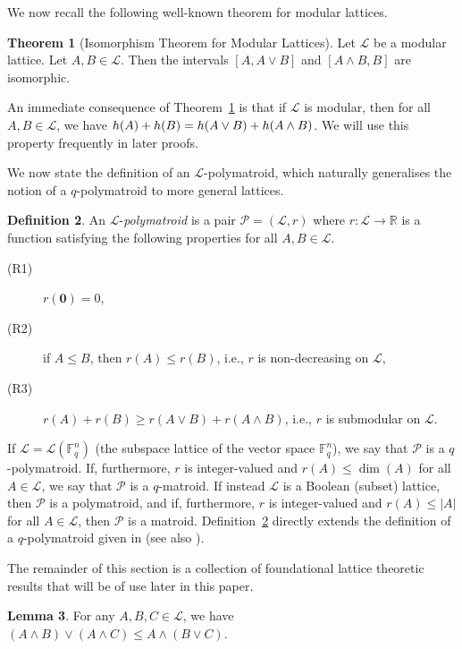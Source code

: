 \documentclass[a4paper,11pt,reqno]{article}
\makeatletter
\def\namedlabel#1#2{\begingroup
    #2%
    \def\@currentlabel{#2}%
    \phantomsection\label{#1}\endgroup
}
\theoremstyle{definition}
\newtheorem{theorem}{Theorem}[section]
\newtheorem{definition}[theorem]{{{Definition}}}
\newtheorem{lemma}[theorem]{{{Lemma}}}
\newcommand{\mL}{\mathcal{L}}
\newcommand{\mP}{\mathcal{P}}
\newcommand{\F}{\mathbb{F}}
\newcommand{\zero}{{\mathbf{0}}}
\makeatother
\begin{document}
We now recall the following well-known theorem for modular lattices.
\begin{theorem}[Isomorphism Theorem for Modular Lattices]\label{thm:isom_thm_lattices}
    Let $\mL$ be a modular lattice. Let $A,B\in\mathcal{L}$. Then the intervals $[A,A\vee B]$ and $[A\wedge B,B]$ are isomorphic.
\end{theorem}
An immediate consequence of Theorem~\ref{thm:isom_thm_lattices} is that if $\mL$ is modular, then for all $A,B\in\mathcal{L}$, we have $\textup{h}(A)+\textup{h}(B)=\textup{h}(A\vee B)+\textup{h}(A\wedge B)$. We will use this property frequently in later proofs.

We now state the definition of an $\mathcal{L}$-polymatroid, which naturally generalises the notion of a $q$-polymatroid to more general lattices.

\begin{definition}\label{def:q-polymatroid}
    An $\mL$-\emph{polymatroid} is a pair $\mP=(\mL,r)$ where $r:\mathcal{L}\to\mathbb{R}$ is a function satisfying the following properties for all $A,B\in\mL$.
    \begin{description}
        \item[\namedlabel{r1}{{\rm (R1)}}] $r(\zero)=0$,
        \item[\namedlabel{r2}{{\rm (R2)}}] if $A \leq B$, then $r(A) \leq r(B)$, i.e., $r$ is non-decreasing on $\mL$,
        \item[\namedlabel{r3}{{\rm (R3)}}] $r(A)+r(B)\geq r(A\vee B)+r(A\wedge B)$, i.e., $r$ is submodular on $\mL$.
    \end{description}
\end{definition}

If $\mL = \mL(\F_q^n)$ (the subspace lattice of the vector space $\mathbb{F}_q^n$), we say that $\mP$ is a $q$-polymatroid. If, furthermore, $r$ is integer-valued and $r(A)\leq\dim(A)$ for all $A\in\mathcal{L}$, we say that $\mP$ is a $q$-matroid. If instead $\mL$ is a Boolean (subset) lattice, then $\mP$ is a polymatroid, and if, furthermore, $r$ is integer-valued and $r(A)\leq|A|$ for all $A\in\mathcal{L}$, then $\mP$ is a matroid. Definition~\ref{def:q-polymatroid} directly extends the definition of a $q$-polymatroid given in \cite{shiromoto19} (see also \cite{gorla2019rank}).

The remainder of this section is a collection of foundational lattice theoretic results that will be of use later in this paper.

\begin{lemma}\label{lem:gen_latt_distrib}
    For any $A,B,C\in\mathcal{L}$, we have $(A\wedge B)\vee (A\wedge C)\leq A\wedge (B\vee C).$
\end{lemma}
\end{document}
